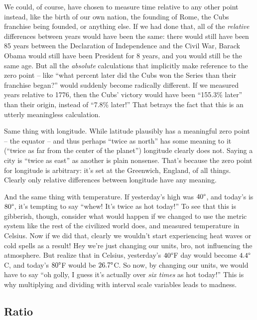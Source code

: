 We could, of course, have chosen to measure time relative to any other point
instead, like the birth of our own nation, the founding of Rome, the Cubs
franchise being founded, or anything else. If we had done that, all of the
\textit{relative} differences between years would have been the same: there
would still have been 85 years between the Declaration of Independence and the
Civil War, Barack Obama would still have been President for 8 years, and you
would still be the same age. But all the \textit{absolute} calculations that
implicitly make reference to the zero point -- like ``what percent later did
the Cubs won the Series than their franchise began?'' would suddenly become
radically different. If we measured years relative to 1776, then the Cubs'
victory would have been ``155.3\% later'' than their origin, instead of ``7.8\%
later!'' That betrays the fact that this is an utterly meaningless calculation.

Same thing with longitude. While latitude plausibly has a meaningful zero point
-- the equator -- and thus perhaps ``twice as north'' has some meaning to it
(``twice as far from the center of the planet'') longitude clearly does not.
Saying a city is ``twice as east'' as another is plain nonsense. That's because
the zero point for longitude is arbitrary: it's set at the Greenwich, England,
of all things. Clearly only relative differences between longitude have any
meaning.

And the same thing with temperature. If yesterday's high was $40\degree$, and
today's is $80\degree$, it's tempting to say ``whew! It's twice as hot today!''
To see that this is gibberish, though, consider what would happen if we changed
to use the metric system like the rest of the civilized world does, and
measured temperature in Celsius. Now if we did that, clearly we wouldn't start
experiencing heat waves or cold spells as a result! Hey we're just changing our
units, bro, not influencing the atmosphere. But realize that in Celsius,
yesterday's $40\degree$F day would become $4.4\degree$C, and today's
$80\degree$F would be $26.7\degree$C. So now, by changing our units, we would
have to say ``oh golly, I guess it's actually over \textit{six times} as hot
today!'' This is why multiplying and dividing with interval scale variables
leads to madness.


\subsection{Ratio}

